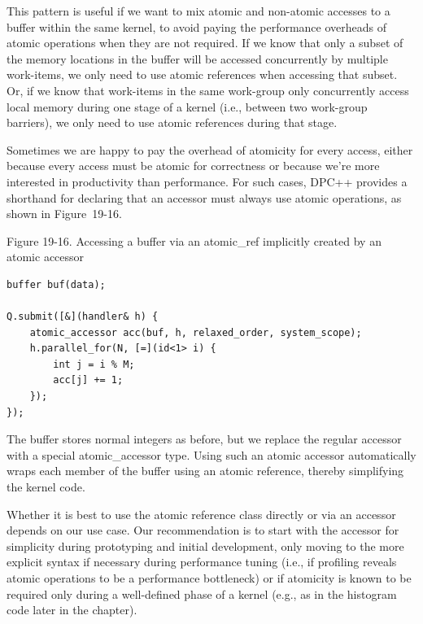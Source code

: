 This pattern is useful if we want to mix atomic and non-atomic accesses to a buffer within the same kernel, to avoid paying the performance overheads of atomic operations when they are not required. If we know that only a subset of the memory locations in the buffer will be accessed concurrently by multiple work-items, we only need to use atomic references when accessing that subset. Or, if we know that work-items in the same work-group only concurrently access local memory during one stage of a kernel (i.e., between two work-group barriers), we only need to use atomic references during that stage.\par

Sometimes we are happy to pay the overhead of atomicity for every access, either because every access must be atomic for correctness or because we’re more interested in productivity than performance. For such cases, DPC++ provides a shorthand for declaring that an accessor must always use atomic operations, as shown in Figure 19-16.\par

\hspace*{\fill} \par %
Figure 19-16. Accessing a buffer via an atomic\_ref implicitly created by an atomic accessor
\begin{lstlisting}[caption={}]
buffer buf(data);

Q.submit([&](handler& h) {
	atomic_accessor acc(buf, h, relaxed_order, system_scope);
	h.parallel_for(N, [=](id<1> i) {
		int j = i % M;
		acc[j] += 1;
	});
});
\end{lstlisting}

The buffer stores normal integers as before, but we replace the regular accessor with a special atomic\_accessor type. Using such an atomic accessor automatically wraps each member of the buffer using an atomic reference, thereby simplifying the kernel code.\par

Whether it is best to use the atomic reference class directly or via an accessor depends on our use case. Our recommendation is to start with the accessor for simplicity during prototyping and initial development, only moving to the more explicit syntax if necessary during performance tuning (i.e., if profiling reveals atomic operations to be a performance bottleneck) or if atomicity is known to be required only during a well-defined phase of a kernel (e.g., as in the histogram code later in the chapter).\par

